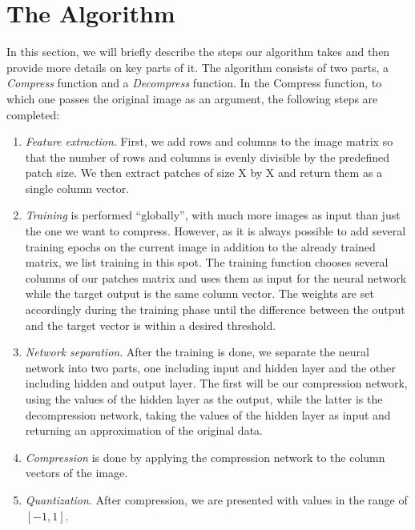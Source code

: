\section{The Algorithm}
\label{sec:algorithm}

In this section, we will briefly describe the steps our algorithm takes and then provide more details on key parts of it. The algorithm consists of two parts, a \emph{Compress} function and a \emph{Decompress} function. In the Compress function, to which one passes the original image as an argument, the following steps are completed:
\begin{enumerate}
\item \emph{Feature extraction}. First, we add rows and columns to the image matrix so that the number of rows and columns is evenly divisible by the predefined patch size. We then extract patches of size {\color{red}X by X} and return them as a single column vector.

\item \emph{Training} is performed ``globally'', with much more images as input than just the one we want to compress. However, as it is always possible to add several training epochs on the current image in addition to the already trained matrix, we list training in this spot. The training function chooses several columns of our patches matrix and uses them as input for the neural network while the target output is the same column vector. The weights are set accordingly during the training phase until the difference between the output and the target vector is within a desired threshold.

\item \emph{Network separation}. After the training is done, we separate the neural network into two parts, one including input and hidden layer and the other including hidden and output layer. The first will be our compression network, using the values of the hidden layer as the output, while the latter is the decompression network, taking the values of the hidden layer as input and returning an approximation of the original data.

\item \emph{Compression} is done by applying the compression network to the column vectors of the image.

\item \emph{Quantization}. After compression, we are presented with values in the range of \([-1, 1]\). 
\end{enumerate}


